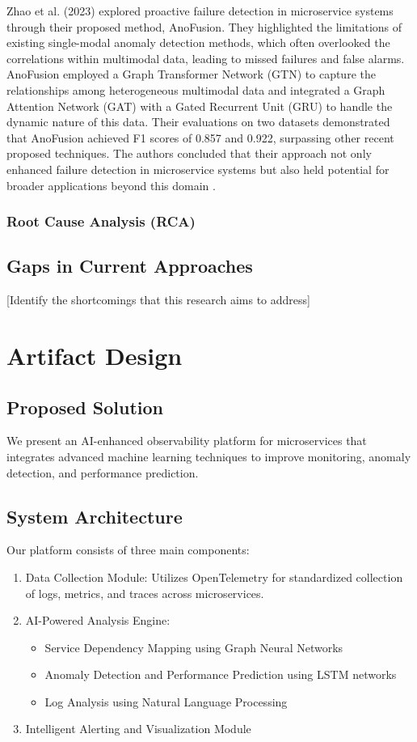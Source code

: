 \documentclass[10pt,journal,compsoc]{IEEEtran}
\begin{document}
Zhao et al. (2023) explored proactive failure detection in microservice systems through their proposed method, AnoFusion. They highlighted the limitations of existing single-modal anomaly detection methods, which often overlooked the correlations within multimodal data, leading to missed failures and false alarms. AnoFusion employed a Graph Transformer Network (GTN) to capture the relationships among heterogeneous multimodal data and integrated a Graph Attention Network (GAT) with a Gated Recurrent Unit (GRU) to handle the dynamic nature of this data. Their evaluations on two datasets demonstrated that AnoFusion achieved F1 scores of 0.857 and 0.922, surpassing other recent proposed techniques. The authors concluded that their approach not only enhanced failure detection in microservice systems but also held potential for broader applications beyond this domain \cite{zhao2023robust}.


\subsubsection{Root Cause Analysis (RCA)}



\subsection{Gaps in Current Approaches}
[Identify the shortcomings that this research aims to address]

\section{Artifact Design}
\subsection{Proposed Solution}
We present an AI-enhanced observability platform for microservices that integrates advanced machine learning techniques to improve monitoring, anomaly detection, and performance prediction.

\subsection{System Architecture}
Our platform consists of three main components:
\begin{enumerate}
    \item Data Collection Module: Utilizes OpenTelemetry for standardized collection of logs, metrics, and traces across microservices.
    \item AI-Powered Analysis Engine:
    \begin{itemize}
        \item Service Dependency Mapping using Graph Neural Networks
        \item Anomaly Detection and Performance Prediction using LSTM networks
        \item Log Analysis using Natural Language Processing
    \end{itemize}
    \item Intelligent Alerting and Visualization Module
\end{enumerate}
\end{document}
